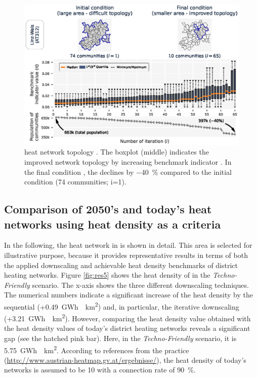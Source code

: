 \begin{figure}
	\centering
	\includegraphics[width=1\linewidth]{figures/4_Results/Fig_Boxplot/ext_boxplot.eps}
	\caption{ heat network topology . The boxplot (middle) indicates the improved network topology by  increasing benchmark indicator . In the final condition , the  declines by \SI{-40}{\%} compared to the initial condition (74 communities; i=1).}
	\label{fig:res3}
\end{figure}

\subsection{Comparison of 2050's and today's  heat networks using heat density as a criteria}\label{res:5}
In the following, the  heat network in  is shown in detail. This area is selected for illustrative purpose, because it provides representative results in terms of both the applied downscaling and achievable heat density benchmarks of district heating networks. Figure \ref{fig:res5} shows the heat density of  in the \textit{Techno-Friendly} scenario. The x-axis shows the three different downscaling techniques. The numerical numbers indicate a significant increase of the heat density by the sequential (+\SI{0.49}{GWh \per km^2}) and, in particular, the iterative downscaling (+\SI{3.21}{GWh \per km^2}). However, comparing the heat density value obtained with the heat density values of today's district heating networks reveals a significant gap (see the hatched pink bar). Here, in the \textit{Techno-Friendly} scenario, it is \SI{5.75}{GWh \per km^2}. According to references from the practice (\url{http://www.austrian-heatmap.gv.at/ergebnisse/}), the  heat density of today's networks is assumed to be \SI{10}{} with a connection rate of \SI{90}{\%}.

